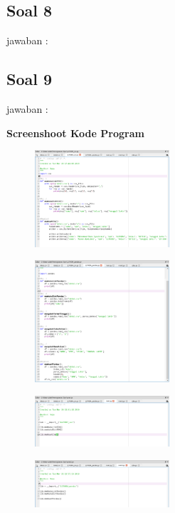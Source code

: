 \subsection{Soal 8}
jawaban : 

\subsection{Soal 9}
jawaban : 

\textbf{ Screenshoot Kode Program}

\begin{figure}[H]
 \includegraphics[width=5cm]{figures/4/1174084/Praktek/c4_1.png}
 \centering
\end{figure}

\begin{figure}[H]
 \includegraphics[width=5cm]{figures/4/1174084/Praktek/c4_2.png}
 \centering
\end{figure}

\begin{figure}[H]
 \includegraphics[width=5cm]{figures/4/1174084/Praktek/c4_3.png}
 \centering
\end{figure}

\begin{figure}[H]
 \includegraphics[width=5cm]{figures/4/1174084/Praktek/c4_4.png}
 \centering
\end{figure}

